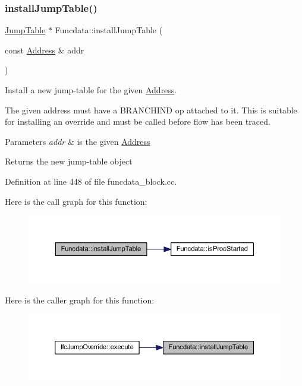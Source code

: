 \subsubsection{\texorpdfstring{installJumpTable()}{installJumpTable()}}
{\footnotesize\ttfamily \mbox{\hyperlink{class_jump_table}{Jump\+Table}} $\ast$ Funcdata\+::install\+Jump\+Table (\begin{DoxyParamCaption}\item[{const \mbox{\hyperlink{class_address}{Address}} \&}]{addr }\end{DoxyParamCaption})}



Install a new jump-\/table for the given \mbox{\hyperlink{class_address}{Address}}. 

The given address must have a B\+R\+A\+N\+C\+H\+I\+ND op attached to it. This is suitable for installing an override and must be called before flow has been traced. 
\begin{DoxyParams}{Parameters}
{\em addr} & is the given \mbox{\hyperlink{class_address}{Address}} \\
\hline
\end{DoxyParams}
\begin{DoxyReturn}{Returns}
the new jump-\/table object 
\end{DoxyReturn}


Definition at line 448 of file funcdata\+\_\+block.\+cc.

Here is the call graph for this function\+:
\nopagebreak
\begin{figure}[H]
\begin{center}
\leavevmode
\includegraphics[width=350pt]{class_funcdata_a337a544e372368eb5c41b1bb5e410932_cgraph}
\end{center}
\end{figure}
Here is the caller graph for this function\+:
\nopagebreak
\begin{figure}[H]
\begin{center}
\leavevmode
\includegraphics[width=350pt]{class_funcdata_a337a544e372368eb5c41b1bb5e410932_icgraph}
\end{center}
\end{figure}
\mbox{\label{class_funcdata_a9021f01b57f8704db66341bc7f65f39f}} 
